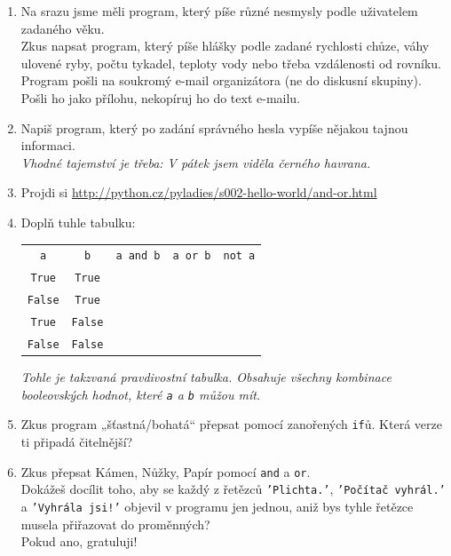 \documentclass[a4paper,10pt]{article}
\newcommand\True{\texttt{True}}
\newcommand\False{\texttt{False}}
\begin{document}
\begin{enumerate}[resume]

\item Na srazu jsme měli program, který píše různé nesmysly podle uživatelem zadaného věku.
    \\Zkus napsat program, který píše hlášky podle zadané
    rychlosti chůze, váhy ulovené ryby, počtu tykadel, teploty vody
    nebo třeba vzdálenosti od rovníku.
    \\Program pošli na soukromý e-mail organizátora (ne do diskusní skupiny).
    Pošli ho jako přílohu, nekopíruj ho do text e-mailu.

\item Napiš program, který po zadání správného hesla vypíše nějakou tajnou informaci.
    \\\emph{\small Vhodné tajemství je třeba: V pátek jsem viděla černého havrana.}

\item Projdi si \url{http://python.cz/pyladies/s002-hello-world/and-or.html}

\item Doplň tuhle tabulku:

    {
        \newcommand\rowend{\rule{0pt}{0.5cm}\\ \hline}
        \begin{tabular}{c|c|c|c|c}
        \arrayrulecolor{silver}
        \verb+a+ & \verb+b+ & \verb+a and b+ & \verb+a or b+ & \verb+not a+ \\
        \arrayrulecolor{black}\hline\arrayrulecolor{silver}
        \True & \True &  &  &  \rowend
        \False & \True &  &  &  \rowend
        \True & \False &  &  &  \rowend
        \False & \False &  &  &  \rowend
        \end{tabular}
    }

    \emph{\small Tohle je takzvaná \emph{pravdivostní tabulka}.
          Obsahuje všechny kombinace booleovských hodnot, které \texttt{a} a \texttt{b}
          můžou mít.}

\item Zkus program „šťastná/bohatá“ přepsat pomocí zanořených \texttt{if}ů. Která verze ti připadá čitelnější?

\item Zkus přepsat Kámen, Nůžky, Papír pomocí \texttt{and} a \texttt{or}.
    \\Dokážeš docílit toho, aby se každý z řetězců \texttt{'Plichta.'},
    \texttt{'Počítač vyhrál.'} a \texttt{'Vyhrála jsi!'} objevil v programu jen jednou,
    aniž bys tyhle řetězce musela přiřazovat do proměnných?
    \\Pokud ano, gratuluji!

\end{enumerate}
\end{document}
